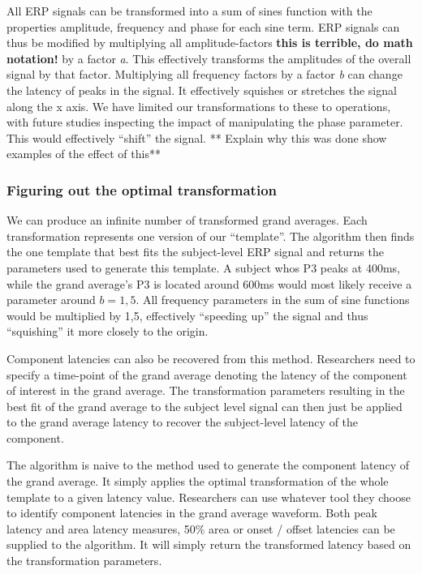 \documentclass[
  man,floatsintext]{apa7}
\begin{document}
All ERP signals can be transformed into a sum of sines function with the properties amplitude, frequency and phase for each sine term. ERP signals can thus be modified by multiplying all amplitude-factors \textbf{this is terrible, do math notation!} by a factor \emph{a}. This effectively transforms the amplitudes of the overall signal by that factor. Multiplying all frequency factors by a factor \emph{b} can change the latency of peaks in the signal. It effectively squishes or stretches the signal along the x axis. We have limited our transformations to these to operations, with future studies inspecting the impact of manipulating the phase parameter. This would effectively ``shift'' the signal.
** Explain why this was done\textbf{
} show examples of the effect of this**

\hypertarget{figuring-out-the-optimal-transformation}{%
\subsubsection{Figuring out the optimal transformation}\label{figuring-out-the-optimal-transformation}}

We can produce an infinite number of transformed grand averages. Each transformation represents one version of our ``template''. The algorithm then finds the one template that best fits the subject-level ERP signal and returns the parameters used to generate this template. A subject whos P3 peaks at 400ms, while the grand average's P3 is located around 600ms would most likely receive a parameter around \(b = 1,5\). All frequency parameters in the sum of sine functions would be multiplied by 1,5, effectively ``speeding up'' the signal and thus ``squishing'' it more closely to the origin.

Component latencies can also be recovered from this method. Researchers need to specify a time-point of the grand average denoting the latency of the component of interest in the grand average. The transformation parameters resulting in the best fit of the grand average to the subject level signal can then just be applied to the grand average latency to recover the subject-level latency of the component.

The algorithm is naive to the method used to generate the component latency of the grand average. It simply applies the optimal transformation of the whole template to a given latency value. Researchers can use whatever tool they choose to identify component latencies in the grand average waveform. Both peak latency and area latency measures, 50\% area or onset / offset latencies can be supplied to the algorithm. It will simply return the transformed latency based on the transformation parameters.
\end{document}
